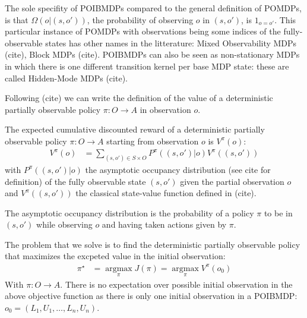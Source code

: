 The sole specifity of POIBMDPs compared to the general definition of POMDPs, is that $\Omega(o|(s, o'))$, the probability of observing $o$ in $(s,o')$, is $1_{o=o'}$.
This particular instance of POMDPs with observations being some indices of the fully-observable states has other names in the litterature: Mixed Observability MDPs (cite), Block MDPs (cite).
POIBMDPs can also be seen as non-stationary MDPs in which there is one different transition kernel per base MDP state: these are called Hidden-Mode MDPs (cite). 

Following (cite) we can write the definition of the value of a deterministic partially observable policy $\pi:O\rightarrow A$ in observation $o$.

\begin{definition} The expected cumulative discounted reward of a deterministic partially observable policy $\pi:O\rightarrow A$ starting from observation $o$ is $V^{\pi}(o)$:
    \begin{align*}
        V^{\pi}(o) &= \underset{(s,o')\in S\times O}{\sum}P^{\pi}((s, o')|o)V^{\pi}((s, o'))
    \end{align*}
with $P^{\pi}((s, o')|o)$ the asymptotic occupancy distribution (see cite for definition) of the fully observable state $(s,o')$ given the partial observation $o$ and $V^{\pi}((s, o'))$ the classical state-value function defined in (cite).
\end{definition}


The asymptotic occupancy distribution is the probability of a policy $\pi$ to be in $(s,o')$ while observing $o$ and having taken actions given by $\pi$.  

The problem that we solve is to find the deterministic partially observable policy that maximizes the excpeted value in the initial observation:
\begin{align}
    \pi^{\star} &= \underset{\pi}{\operatorname{argmax}}J(\pi) = \underset{\pi}{\operatorname{argmax}}V^{\pi}(o_0)
\end{align}
With $\pi:O\rightarrow A$. There is no expectation over possible initial observation in the above objective function as there is only one initial observation in a POIBMDP: $o_0=(L_1, U_1, \dots, L_n, U_n)$.

